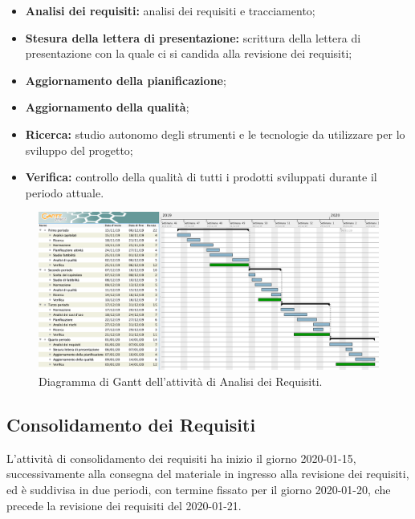 				\begin{itemize}
					\item \textbf{Analisi dei requisiti:} analisi dei requisiti e tracciamento;
					\item \textbf{Stesura della lettera di presentazione:} scrittura della lettera di presentazione con la quale ci si candida alla revisione dei requisiti;
					\item \textbf{Aggiornamento della pianificazione};
					\item \textbf{Aggiornamento della qualità};
					\item \textbf{Ricerca:} studio autonomo degli strumenti e le tecnologie da utilizzare per lo sviluppo del progetto;
					\item \textbf{Verifica:} controllo della qualità di tutti i prodotti sviluppati durante il periodo attuale.
				\end{itemize}
        
        \begin{landscape}

          \begin{figure}[H]
            \centering
            \includegraphics[width=\linewidth]{images/ganttAnalisi}
            \caption{Diagramma di Gantt dell'attività di Analisi dei Requisiti.}
          \end{figure}
				

		\end{landscape}
		
		\subsection{Consolidamento dei Requisiti}
		
			L'attività di consolidamento dei requisiti ha inizio il giorno 2020-01-15, successivamente alla consegna del materiale in ingresso alla revisione dei requisiti, ed è suddivisa in due periodi, con termine fissato per il giorno 2020-01-20, che precede la revisione dei requisiti del 2020-01-21.
			
